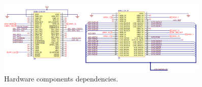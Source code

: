\begin{figure}
    \centering
    \includegraphics[width=0.9\textwidth,keepaspectratio]{chap/hardFig/BBB_pins_sch}
    \caption{Hardware components dependencies.}
    \label{fig:pin modes}
\end{figure}

\clearpage


